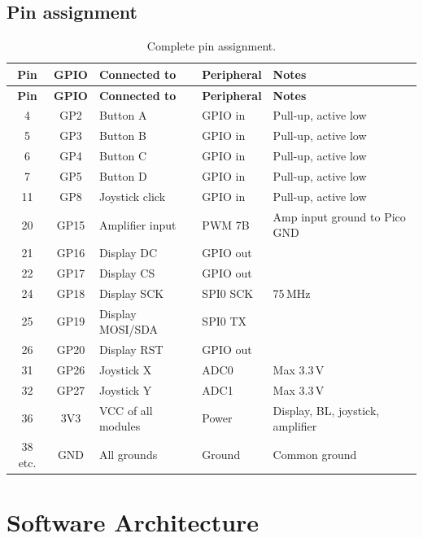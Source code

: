 \documentclass[11pt,a4paper]{article}
\begin{document}
\subsection{Pin assignment}\label{sec:pins}
\small\begin{longtable}{cclp{2.2cm}p{3.6cm}}
\caption{Complete pin assignment.}\label{tab:pins}\\
\toprule
\textbf{Pin} & \textbf{GPIO} & \textbf{Connected to} & \textbf{Peripheral} & \textbf{Notes} \\
\midrule\endfirsthead
\toprule
\textbf{Pin} & \textbf{GPIO} & \textbf{Connected to} & \textbf{Peripheral} & \textbf{Notes} \\
\midrule\endhead
4 & GP2 & Button A & GPIO in & Pull-up, active low \\
5 & GP3 & Button B & GPIO in & Pull-up, active low \\
6 & GP4 & Button C & GPIO in & Pull-up, active low \\
7 & GP5 & Button D & GPIO in & Pull-up, active low \\
11 & GP8 & Joystick click & GPIO in & Pull-up, active low \\
20 & GP15 & Amplifier input & PWM 7B & Amp input ground to Pico GND \\
21 & GP16 & Display DC & GPIO out & \\
22 & GP17 & Display CS & GPIO out & \\
24 & GP18 & Display SCK & SPI0 SCK & 75\,MHz \\
25 & GP19 & Display MOSI/SDA & SPI0 TX & \\
26 & GP20 & Display RST & GPIO out & \\
31 & GP26 & Joystick X & ADC0 & Max 3.3\,V \\
32 & GP27 & Joystick Y & ADC1 & Max 3.3\,V \\
36 & 3V3 & VCC of all modules & Power & Display, BL, joystick, amplifier \\
38 etc. & GND & All grounds & Ground & Common ground \\
\bottomrule
\end{longtable}\normalsize

\section{Software Architecture}\label{sec:software}
\end{document}
